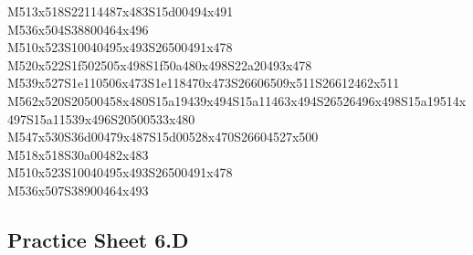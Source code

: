 \documentclass{article}
\begin{document}
\begin{multicols}{5}
\begin{center}
M513x518S22114487x483S15d00494x491 %
\\M536x504S38800464x496 %
\\M510x523S10040495x493S26500491x478 %
\\M520x522S1f502505x498S1f50a480x498S22a20493x478 %
\\M539x527S1e110506x473S1e118470x473S26606509x511S26612462x511 %
\\M562x520S20500458x480S15a19439x494S15a11463x494S26526496x498S15a19514x497S15a11539x496S20500533x480 %
\\M547x530S36d00479x487S15d00528x470S26604527x500 %
\\M518x518S30a00482x483 %
\\M510x523S10040495x493S26500491x478 %
\\M536x507S38900464x493 %
\vfil

\end{center}
\end{multicols}

\subsection{Practice Sheet 6.D}
\end{document}
